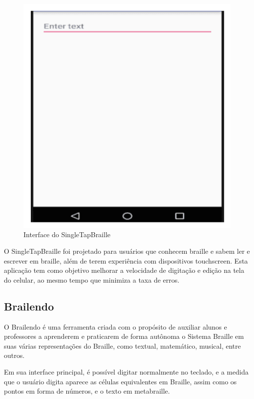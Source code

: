 \begin{figure}[h]
    \centering
    \includegraphics[scale=0.5]{ch02/assets/singletapbraille-gui.png}
    \decoRule
    \caption[Interface do SingleTapBraille]{Interface do SingleTapBraille \parencite{REF07}}
    \label{fig:ch02-singletapbraille-gui}
\end{figure}

O SingleTapBraille foi projetado para usuários que conhecem braille e sabem ler e escrever em braille, além de terem experiência com dispositivos touchscreen. Esta aplicação tem como objetivo melhorar a velocidade de digitação e edição na tela do celular, ao mesmo tempo que minimiza a taxa de erros.

\subsection{Brailendo}

O Brailendo \parencite{REF09} é uma ferramenta criada com o propósito de auxiliar alunos e professores a aprenderem e praticarem de forma autônoma o Sistema Braille em suas várias representações do Braille, como textual, matemático, musical, entre outros.

Em sua interface principal, é possível digitar normalmente no teclado, e a medida que o usuário digita aparece as células equivalentes em Braille, assim como os pontos em forma de números, e o texto em metabraille.

